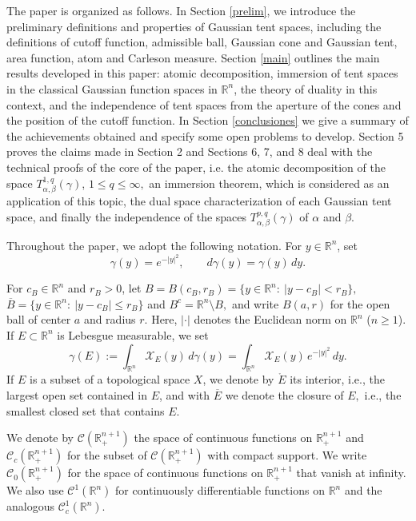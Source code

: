 \documentclass[leqno,11pt]{amsart}
\theoremstyle{plain}
\theoremstyle{remark}
\begin{document}
The paper is organized as follows. In Section \ref{prelim}, we introduce the preliminary definitions and properties of Gaussian tent spaces, including the definitions of cutoff function, admissible ball, Gaussian cone and Gaussian tent, area function, atom and Carleson measure. Section \ref{main} outlines the main results developed in this paper: atomic decomposition, immersion of tent spaces in the classical Gaussian function spaces in $\mathbb{R}^n$, the theory of duality in this context, and the independence of tent spaces from the aperture of the cones and the position of the cutoff function. In Section \ref{conclusiones} we give a summary of the achievements obtained and specify some open problems to develop. Section 5 proves the claims made in Section 2 and Sections 6, 7, and 8 deal with the technical proofs of the core of the paper, i.e. the atomic decomposition of the space $T^{1,q}_{\alpha, \beta}(\gamma)$, $1\le q\le \infty,$ an immersion theorem, which is considered as an application of this topic, the dual space characterization of each Gaussian tent space, and finally the independence of the spaces \( T^{p,q}_{\alpha, \beta}(\gamma) \) of $\alpha$ and $\beta$.


Throughout the paper, we adopt the following notation. For $y\in\mathbb{R}^n$, set
\[
\gamma(y)=e^{-|y|^2},\qquad d\gamma(y)=\gamma(y)\,dy.
\]

\noindent For $c_B\in\mathbb{R}^n$ and $r_B>0$, let
$ 
B=B(c_B,r_B)=\{y\in\mathbb{R}^n:\ |y-c_B|<r_B\},$  $
\overline{B}=\{y\in\mathbb{R}^n:\ |y-c_B|\le r_B\}$ and
$B^c=\mathbb{R}^n\setminus B,
$ 
and write $B(a,r)$ for the open ball of center $a$ and radius $r$. Here, $|\cdot|$ denotes the Euclidean norm on $\mathbb{R}^n$ ($n\ge1$). If $E\subset\mathbb{R}^n$ is Lebesgue measurable, we set
\[
\gamma(E):=\int_{\mathbb{R}^n}\mathcal{X}_E(y)\,d\gamma(y)=\int_{\mathbb{R}^n}\mathcal{X}_E(y)\,e^{-|y|^2}\,dy.
\]
If $E$ is a subset of a topological space $X$, we denote by $\mathring{E}$ its interior, i.e., the largest open set contained in $E$, and with $\overline{E}$ we denote the closure of $E,$ i.e., the smallest closed set that contains $E$.

\noindent We denote by $\mathscr{C}(\mathbb{R}^{n+1}_+)$ the space of continuous functions on $\mathbb{R}^{n+1}_+$ and $\mathscr{C}_c(\mathbb{R}^{n+1}_+)$ for the subset of $\mathscr{C}(\mathbb{R}^{n+1}_+)$ with compact support.
 We write $\mathscr{C}_0(\mathbb{R}^{n+1}_+)$ for the space of continuous functions on $\mathbb{R}^{n+1}_+$ that vanish at infinity. 
\noindent We also use $\mathscr{C}^1(\mathbb{R}^n)$ for continuously differentiable functions on $\mathbb{R}^n$ and the analogous
$\mathscr{C}_c^1(\mathbb{R}^{n}).$
\end{document}
